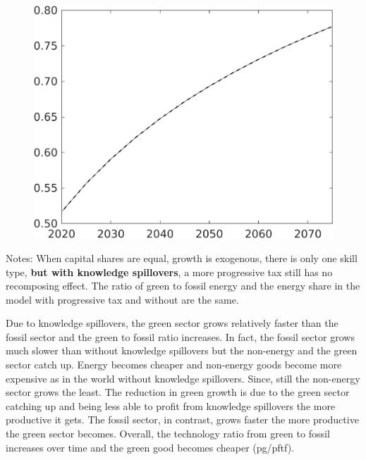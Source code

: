 \documentclass[12pt]{article}
\begin{document}
\begin{figure}[h!!]
\begin{minipage}[]{0.32\textwidth}
\end{minipage}		
\begin{minipage}[]{0.32\textwidth}
\includegraphics[width=1\textwidth]{../../codding_model/own_basedOnFried/optimalPol_010922_revision/figures/all_13Sept22/CompTaul_Equlab_LFBAU_Reg0_LgLf_spillover0_nsk1_xgr1_knspil0_sep1_countec0_GovRev0_etaa0.79_lgd0.png}
\end{minipage}	
\end{figure}
Notes: When capital shares are equal, growth is exogenous, there is only one skill type, \textbf{but with knowledge spillovers}, a more progressive tax still has no recomposing effect. The ratio of green to fossil energy and the energy share in the model with progressive tax and without are the same. 

Due to knowledge spillovers, the green sector grows relatively faster than the fossil sector and the green to fossil ratio increases. In fact, the fossil sector grows much slower than without knowledge spillovers but the non-energy and the green sector catch up. Energy becomes cheaper and non-energy goods become more expensive as in the world without knowledge spillovers. Since, still the non-energy sector  grows the least. The reduction in green growth is due to the green sector catching up and being less able to profit from knowledge spillovers the more productive it gets. The fossil sector, in contrast, grows faster the more productive the green sector becomes. Overall, the technology ratio from green to fossil increases over time and the green good becomes cheaper (pg/pftf). 
\end{document}

